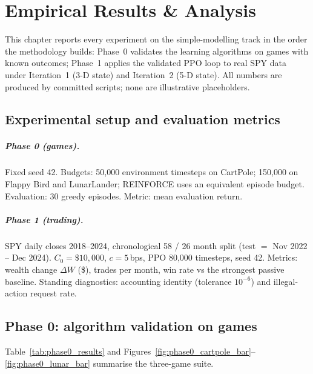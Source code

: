 \chapter{Empirical Results \& Analysis}
\label{ch:results_simple}

This chapter reports every experiment on the simple-modelling track in the order the methodology builds: Phase~0 validates the learning algorithms on games with known outcomes; Phase~1 applies the validated PPO loop to real SPY data under Iteration~1 (3-D state) and Iteration~2 (5-D state). All numbers are produced by committed scripts; none are illustrative placeholders.

\section{Experimental setup and evaluation metrics}
\label{sec:setup_simple}

\paragraph{Phase 0 (games).} Fixed seed 42. Budgets: 50{,}000 environment timesteps on CartPole; 150{,}000 on Flappy Bird and LunarLander; REINFORCE uses an equivalent episode budget. Evaluation: 30 greedy episodes. Metric: mean evaluation return.

\paragraph{Phase 1 (trading).} SPY daily closes 2018--2024, chronological 58 / 26 month split (test $=$ Nov 2022 -- Dec 2024). $C_0=\$10{,}000$, $c=5$\,bps, PPO 80{,}000 timesteps, seed 42. Metrics: wealth change $\Delta W$ (\$), trades per month, win rate vs the strongest passive baseline. Standing diagnostics: accounting identity (tolerance $10^{-6}$) and illegal-action request rate.

\section{Phase 0: algorithm validation on games}
\label{sec:phase0_results}

Table~\ref{tab:phase0_results} and Figures~\ref{fig:phase0_cartpole_bar}--\ref{fig:phase0_lunar_bar} summarise the three-game suite.

